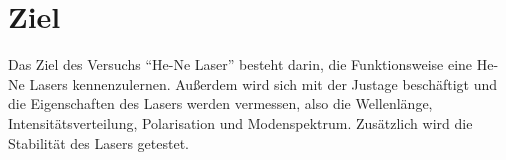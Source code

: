 \section{Ziel}
\label{sec:Ziel}
Das Ziel des Versuchs \enquote{He-Ne Laser} besteht darin, die Funktionsweise eine He-Ne Lasers kennenzulernen.
Außerdem wird sich mit der Justage beschäftigt und die Eigenschaften des Lasers werden vermessen, also die Wellenlänge, Intensitätsverteilung, Polarisation und Modenspektrum.
Zusätzlich wird die Stabilität des Lasers getestet.